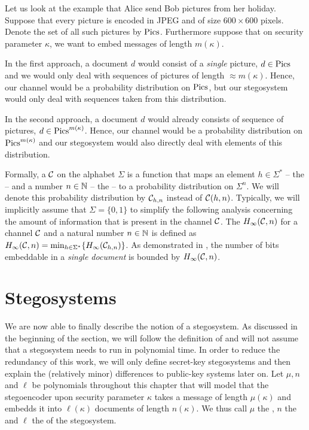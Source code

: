 \begin{example}
  Let us look at the example that Alice send Bob pictures from her
  holiday. Suppose that every picture is encoded in \acs{JPEG} and of
  size $600\times 600$ pixels. Denote the set of all such pictures by
  $\operatorname{Pics}$. Furthermore suppose that on security
  parameter $\kappa$, we want to embed messages of length $m(\kappa)$. 

  In the first approach, a document $d$ would consist of a \emph{single}
  picture, \ie $d\in \operatorname{Pics}$ and we would only deal with sequences of
  pictures of length $\approx m(\kappa)$. Hence, our channel would be a
  probability distribution on $\operatorname{Pics}$, but our stegosystem would only
  deal with sequences taken from this distribution.

  In the second approach, a document $d$ would already consists of sequence
  of pictures, \ie $d\in \operatorname{Pics}^{m(\kappa)}$. Hence, our channel would be a
  probability distribution on $\operatorname{Pics}^{m(\kappa)}$ and our stegosystem would
  also directly deal with elements of this distribution. 
\end{example}

Formally, a  $\mathcal{C}$ on the alphabet $\Sigma$ is a
function that maps an element $h\in \Sigma^{*}$ -- the 
-- and a number $n\in \mathbb{N}$ -- the  -- to a
probability distribution on $\Sigma^{n}$. We will denote this
probability distribution by $\mathcal{C}_{h,n}$ instead of
$\mathcal{C}(h,n)$. Typically, we will implicitly assume that
$\Sigma=\{0,1\}$ to simplify the following analysis concerning the
amount of information that is present in the channel $\mathcal{C}$. The
 $H_{\infty}(\mathcal{C},n)$ for
a channel $\mathcal{C}$ and a natural number $n\in \mathbb{N}$ is defined as
$H_{\infty}(\mathcal{C},n) = \min_{h\in \Sigma^{*}}\{H_{\infty}(\mathcal{C}_{h,n})\}$. As
demonstrated in \cite{hopper2009provably}, the number of bits embeddable
in a \emph{single document} is bounded by $H_{\infty}(\mathcal{C},n)$. 

\section{Stegosystems}
We are now able to finally describe the notion of a stegosystem. As
discussed in the beginning of the section, we will follow the definition
of \cite{hopper2009provably} and will not assume that a stegosystem
needs to run in polynomial time. In order to reduce the redundancy of
this work, we will only define secret-key stegosystems and then
explain the (relatively minor) differences to public-key systems later
on. Let $\mu,n$ and $\ell$ be polynomials throughout this chapter that
will model that the stegoencoder upon security parameter $\kappa$ takes
a message of length $\mu(\kappa)$ and embedds it into $\ell(\kappa)$
documents of length $n(\kappa)$. We thus call $\mu$ the , $n$ the  and $\ell$ the  of the stegosystem. 


